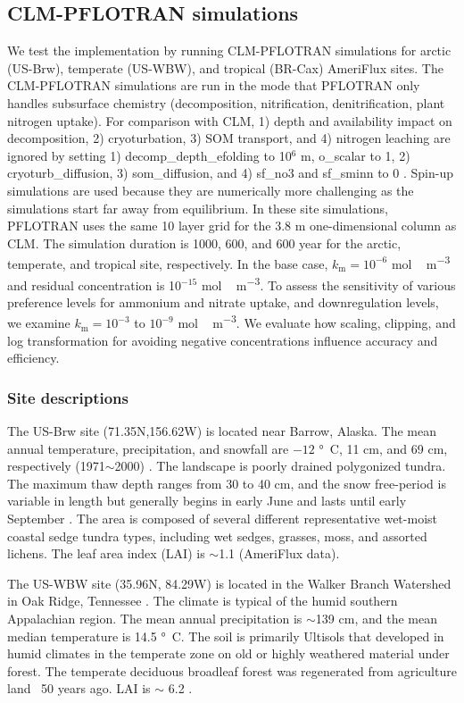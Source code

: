 \documentclass[gmd, manuscript]{copernicus}
\begin{document}
\subsection{CLM-PFLOTRAN simulations}
We test the implementation by running CLM-PFLOTRAN simulations for arctic
(US-Brw), temperate (US-WBW), and tropical (BR-Cax) AmeriFlux sites. The
CLM-PFLOTRAN simulations are run in the mode that PFLOTRAN only handles
subsurface chemistry (decomposition, nitrification, denitrification, plant
nitrogen uptake). For comparison with CLM, 1) depth and  availability
impact on decomposition, 2) cryoturbation, 3) SOM transport, and 4) nitrogen
leaching are ignored by setting 1) decomp\_depth\_efolding to 10$^6$ m,
o\_scalar to 1, 2) cryoturb\_diffusion, 3) som\_diffusion, and 4) sf\_no3 and
sf\_sminn to 0 \citep{Oleson2013}. Spin-up simulations are used because they are numerically more
challenging  as the simulations start far away from equilibrium. In these
site simulations, PFLOTRAN uses the same 10 layer grid for the 3.8 m
one-dimensional column as CLM. The simulation duration is 1000, 600, and 600
year for the arctic, temperate, and tropical site, respectively.
In the base case, $k_\text{m}=10^{-6}$ \unit{mol\,m^{-3}} and
residual concentration is 10$^{-15}$ \unit{mol\,m^{-3}}. To assess the sensitivity
of various preference levels for ammonium and nitrate uptake, and
downregulation levels, we examine  $k_\text{m}=10^{-3}$ to $10^{-9}$
\unit{mol\,m^{-3}}. We evaluate how scaling, clipping, and log transformation for
avoiding negative concentrations influence accuracy and efficiency.

\subsubsection{Site descriptions}
The US-Brw site (71.35N,156.62W) is located near Barrow, Alaska. The mean annual
temperature, precipitation, and snowfall are $-12$ \unit{\degree C}, 11 cm, and
69 cm, respectively (1971$\sim$2000) \citep{Lara2012}. The landscape is poorly
drained polygonized tundra. The maximum thaw depth ranges from 30 to 40 cm, and the
snow free-period is variable in length but generally begins in early June and
lasts until early September \citep{Hinkel2003}. The area is composed of several
different representative wet-moist coastal sedge tundra types, including wet
sedges, grasses, moss, and assorted lichens. The leaf area index (LAI) is
$\sim$1.1 (AmeriFlux data).

The US-WBW site (35.96N, 84.29W) is located in the Walker Branch Watershed in
Oak Ridge, Tennessee \citep{Hanson2003}. The climate is typical of the humid
southern Appalachian region. The mean annual precipitation is $\sim$139 cm, and
the mean median temperature is 14.5 \unit{\degree C}.  
The soil is primarily Ultisols that developed in humid climates in the
temperate zone on old or highly weathered material under forest. The temperate
deciduous broadleaf forest was regenerated from agriculture land ~50 years ago.
LAI is $\sim$ 6.2 \citep{Hanson2004}.
\end{document}

